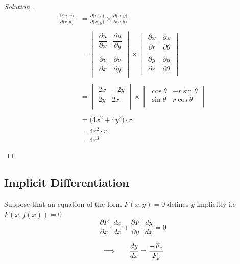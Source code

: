 \documentclass[11pt,a4paper]{article}
\theoremstyle{definition}
\newenvironment{solution}
  {\renewcommand{\qedsymbol}{}\begin{proof}[\textit{Solution}.]}
  {\end{proof}}
\begin{document}
\begin{solution}
\begin{align*}
\frac{\partial \big(u,v\big)}{\partial\big(r,\theta\big)} & = \frac{\partial \big(u,v\big)}{\partial \big(x,y\big)}\times \frac{\partial\big(x,y\big)}{\partial \big(r,\theta\big)}\\\\
& = \begin{vmatrix}
\dfrac{\partial u}{\partial x} & \dfrac{\partial u}{\partial y}\\\\
\dfrac{\partial v}{\partial x} & \dfrac{\partial v}{\partial y}\\
\end{vmatrix} \times
\begin{vmatrix}
\dfrac{\partial x}{\partial r} & \dfrac{\partial x}{\partial \theta}\\\\
\dfrac{\partial y}{\partial r} & \dfrac{\partial y}{\partial \theta}\\
\end{vmatrix}\\\\
& = \begin{vmatrix}
2x & -2y\\
2y & 2x\\
\end{vmatrix}\times 
\begin{vmatrix}
\cos \theta & -r\sin \theta \\
\sin \theta & r\cos \theta\\
\end{vmatrix}\\\\
& = \big(4x^2 + 4y^2\big)\cdot r\\
& = 4r^2\cdot r\\
& = 4r^3\\\\
\end{align*}
\end{solution}

{\color[wave]{485}\subsection{Implicit Differentiation}}
Suppose that an equation of the form $F(x,y) =0$ defines $y$ implicitly i.e $F(x,f(x)) =0$ $$ \frac{\partial F}{\partial x}\cdot \frac{dx}{dx} +\frac{\partial F}{\partial y}\cdot \frac{dy}{dx} = 0$$

$$\implies \hspace{0.5cm} \frac{dy}{dx}=\frac{-F_x}{F_y}$$
\end{document}
